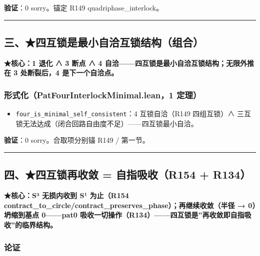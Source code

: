 \documentclass[
]{article}
\providecommand{\tightlist}{%
 \setlength{\itemsep}{0pt}\setlength{\parskip}{0pt}}
\begin{document}
\textbf{验证}：0 sorry。锚定 R149 quadriphase\_interlock。

\begin{center}\rule{0.5\linewidth}{0.5pt}\end{center}

\subsection{三、★四互锁是最小自洽互锁结构（组合）}\label{ux4e09ux56dbux4e92ux9501ux662fux6700ux5c0fux81eaux6d3dux4e92ux9501ux7ed3ux6784ux7ec4ux5408}

\textbf{★核心：1 退化 ∧ 3 断点 ∧ 4
自洽------四互锁是最小自洽互锁结构；无限外推在 3 处断裂后，4
是下一个自洽点。}

\subsubsection{形式化（PatFourInterlockMinimal.lean，1
定理）}\label{ux5f62ux5f0fux5316patfourinterlockminimal.lean1-ux5b9aux7406}

\begin{itemize}
\tightlist
\item
 \texttt{four\_is\_minimal\_self\_consistent}：4 互锁自洽（R149
 四组互锁）∧ 三互锁无法达成（闭合回路自由度不足）------四互锁最小自洽。
\end{itemize}

\textbf{验证}：0 sorry。合取项分别锚 R149 / 第一节。

\begin{center}\rule{0.5\linewidth}{0.5pt}\end{center}

\subsection{四、★四互锁再收敛 = 自指吸收（R154 +
R134）}\label{ux56dbux56dbux4e92ux9501ux518dux6536ux655b-ux81eaux6307ux5438ux6536r154-r134}

\textbf{★核心：S³ 无损内收到 S¹ 为止（R154
contract\_to\_circle/contract\_preserves\_phase）；再继续收敛（半径 →
0）坍缩到基点 0------pat0
吸收一切操作（R134）------四互锁是''再收敛即自指吸收''的临界结构。}

\subsubsection{论证}\label{ux8bbaux8bc1-2}
\end{document}
